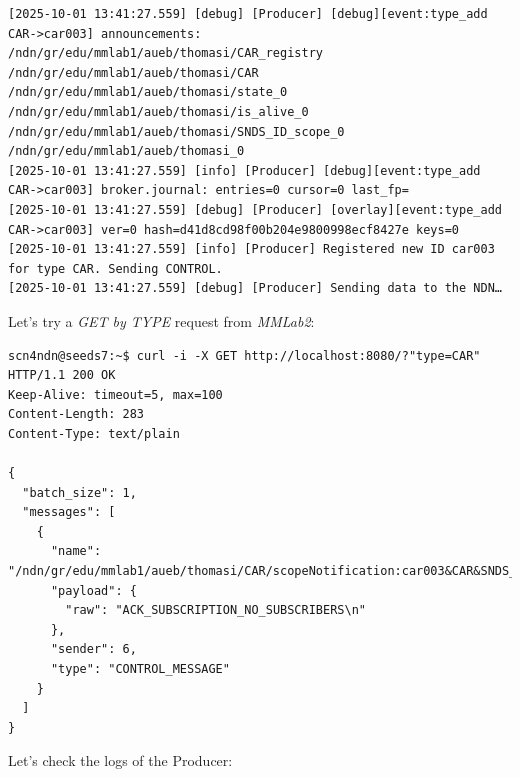 \documentclass{article}
\begin{document}
\begin{lstlisting}[language=log, caption={SeEDS Service logs after publishing through the \emph{MMLab2} node to \textit{@type=CAR} registry}, label={lst:producer-seeds-service-logs-after-publish-through-mmlab2}]
[2025-10-01 13:41:27.559] [debug] [Producer] [debug][event:type_add CAR->car003] announcements: /ndn/gr/edu/mmlab1/aueb/thomasi/CAR_registry /ndn/gr/edu/mmlab1/aueb/thomasi/CAR /ndn/gr/edu/mmlab1/aueb/thomasi/state_0 /ndn/gr/edu/mmlab1/aueb/thomasi/is_alive_0 /ndn/gr/edu/mmlab1/aueb/thomasi/SNDS_ID_scope_0 /ndn/gr/edu/mmlab1/aueb/thomasi_0 
[2025-10-01 13:41:27.559] [info] [Producer] [debug][event:type_add CAR->car003] broker.journal: entries=0 cursor=0 last_fp=
[2025-10-01 13:41:27.559] [debug] [Producer] [overlay][event:type_add CAR->car003] ver=0 hash=d41d8cd98f00b204e9800998ecf8427e keys=0
[2025-10-01 13:41:27.559] [info] [Producer] Registered new ID car003 for type CAR. Sending CONTROL.
[2025-10-01 13:41:27.559] [debug] [Producer] Sending data to the NDN…
\end{lstlisting}

Let's try a \emph{GET by TYPE} request from \emph{MMLab2}:

\begin{lstlisting}[language=curl, caption={\emph{GET by TYPE} request for \textit{@type=CAR} registry from \emph{MMLab2}}, label={lst:get-by-type-registry-mmlab2}]
scn4ndn@seeds7:~$ curl -i -X GET http://localhost:8080/?"type=CAR"
HTTP/1.1 200 OK
Keep-Alive: timeout=5, max=100
Content-Length: 283
Content-Type: text/plain

{
  "batch_size": 1,
  "messages": [
    {
      "name": "/ndn/gr/edu/mmlab1/aueb/thomasi/CAR/scopeNotification:car003&CAR&SNDS_ID_scope_1",
      "payload": {
        "raw": "ACK_SUBSCRIPTION_NO_SUBSCRIBERS\n"
      },
      "sender": 6,
      "type": "CONTROL_MESSAGE"
    }
  ]
}
\end{lstlisting}

Let's check the logs of the Producer: 
\end{document}
